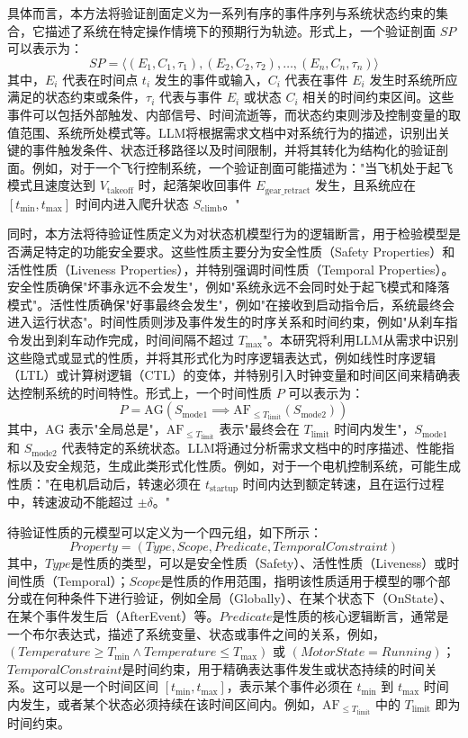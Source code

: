 具体而言，本方法将验证剖面定义为一系列有序的事件序列与系统状态约束的集合，它描述了系统在特定操作情境下的预期行为轨迹。形式上，一个验证剖面 \( SP \) 可以表示为：
$$ SP = \langle (E_1, C_1, \tau_1), (E_2, C_2, \tau_2), \dots, (E_n, C_n, \tau_n) \rangle $$
其中，\( E_i \) 代表在时间点 \( t_i \) 发生的事件或输入，\( C_i \) 代表在事件 \( E_i \) 发生时系统所应满足的状态约束或条件，\( \tau_i \) 代表与事件 $E_i$ 或状态 $C_i$ 相关的时间约束区间。这些事件可以包括外部触发、内部信号、时间流逝等，而状态约束则涉及控制变量的取值范围、系统所处模式等。LLM将根据需求文档中对系统行为的描述，识别出关键的事件触发条件、状态迁移路径以及时间限制，并将其转化为结构化的验证剖面。例如，对于一个飞行控制系统，一个验证剖面可能描述为："当飞机处于起飞模式且速度达到 $V_{\text{takeoff}}$ 时，起落架收回事件 $E_{\text{gear\_retract}}$ 发生，且系统应在 $ [t_{\text{min}}, t_{\text{max}}] $ 时间内进入爬升状态 $S_{\text{climb}}$。"

同时，本方法将待验证性质定义为对状态机模型行为的逻辑断言，用于检验模型是否满足特定的功能安全要求。这些性质主要分为安全性质（Safety Properties）和活性性质（Liveness Properties），并特别强调时间性质（Temporal Properties）。安全性质确保"坏事永远不会发生"，例如"系统永远不会同时处于起飞模式和降落模式"。活性性质确保"好事最终会发生"，例如"在接收到启动指令后，系统最终会进入运行状态"。时间性质则涉及事件发生的时序关系和时间约束，例如"从刹车指令发出到刹车动作完成，时间间隔不超过 $T_{\text{max}}$"。本研究将利用LLM从需求中识别这些隐式或显式的性质，并将其形式化为时序逻辑表达式，例如线性时序逻辑（LTL）或计算树逻辑（CTL）的变体，并特别引入时钟变量和时间区间来精确表达控制系统的时间特性。形式上，一个时间性质 $P$ 可以表示为：
$$ P = \text{AG}(S_{\text{mode1}} \implies \text{AF}_{\le T_{\text{limit}}}(S_{\text{mode2}})) $$
其中，$ \text{AG} $ 表示"全局总是"，$ \text{AF}_{\le T_{\text{limit}}} $ 表示"最终会在 $T_{\text{limit}}$ 时间内发生"，$ S_{\text{mode1}} $ 和 $ S_{\text{mode2}} $ 代表特定的系统状态。LLM将通过分析需求文档中的时序描述、性能指标以及安全规范，生成此类形式化性质。例如，对于一个电机控制系统，可能生成性质："在电机启动后，转速必须在 $t_{\text{startup}}$ 时间内达到额定转速，且在运行过程中，转速波动不能超过 $ \pm \delta $。"

待验证性质的元模型可以定义为一个四元组，如下所示：
\begin{equation}
Property = (Type, Scope, Predicate, TemporalConstraint)
\label{eq:property_model}
\end{equation}
其中，$Type$是性质的类型，可以是安全性质（Safety）、活性性质（Liveness）或时间性质（Temporal）；$Scope$是性质的作用范围，指明该性质适用于模型的哪个部分或在何种条件下进行验证，例如全局（Globally）、在某个状态下（OnState）、在某个事件发生后（AfterEvent）等。$Predicate$是性质的核心逻辑断言，通常是一个布尔表达式，描述了系统变量、状态或事件之间的关系，例如，$ (Temperature \ge T_{\text{min}} \land Temperature \le T_{\text{max}}) $ 或 $ (MotorState = Running) $；$TemporalConstraint$是时间约束，用于精确表达事件发生或状态持续的时间关系。这可以是一个时间区间 $ [t_{\text{min}}, t_{\text{max}}] $，表示某个事件必须在 $t_{\text{min}}$ 到 $t_{\text{max}}$ 时间内发生，或者某个状态必须持续在该时间区间内。例如，$ \text{AF}_{\le T_{\text{limit}}} $ 中的 $ T_{\text{limit}} $ 即为时间约束。

